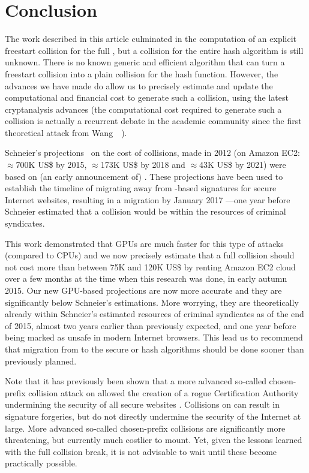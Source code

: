 \section{Conclusion}
\label{sec:conclusion}

The work described in this article culminated in the computation of an explicit freestart collision for the full \shaone, but a collision for the entire hash algorithm is still unknown.
There is no known generic and efficient algorithm that can turn a freestart collision into a plain collision for the hash function.
However, the advances we have made do allow us to precisely estimate and update the computational and financial cost to generate such a collision, using the latest cryptanalysis advances \cite{DBLP:conf/eurocrypt/Stevens13}
(the computational cost required to generate such a collision is actually a recurrent debate in the academic community since the first theoretical attack from Wang~\etal~\cite{DBLP:conf/crypto/WangYY05a}).

Schneier's projections~\cite{schneierSHA1} on the cost of \shaone collisions, made in 2012 (on Amazon EC2: $\approx$700K US\$ by 2015, $\approx$173K US\$ by 2018 and $\approx$43K US\$ by 2021) were based on
(an early announcement of) \cite{DBLP:conf/eurocrypt/Stevens13}. These projections have been used to establish the timeline of migrating away from \shaone-based signatures for secure Internet websites,
resulting in a migration by January 2017 ---one year before Schneier estimated that a \shaone collision would be within the resources of criminal syndicates. 

This work demonstrated that GPUs are much faster for this type of attacks (compared to CPUs)
and we now precisely estimate that a full \shaone collision should not cost more than between 75K and 120K US\$ by renting Amazon EC2 cloud over a few months at the time when this research was done, in early autumn 2015.
Our new GPU-based projections are now more accurate and they are significantly below Schneier's estimations. More worrying, they are theoretically already within Schneier's estimated resources of criminal syndicates as of the end of 2015,
almost two years earlier than previously expected, and one year before \shaone being marked as unsafe in modern Internet browsers.
This lead us to recommend that migration from \shaone to the secure \shatwo or \shathree hash algorithms should be done sooner than previously planned.

Note that it has previously been shown that a more advanced so-called chosen-prefix collision attack on \mdfive allowed the creation of a rogue Certification Authority undermining the security of all secure websites \cite{DBLP:conf/crypto/StevensSALMOW09}. 
Collisions on \shaone can result in \eg{} signature forgeries, but do not directly undermine the security of the Internet at large. More advanced so-called chosen-prefix collisions \cite{DBLP:conf/crypto/StevensSALMOW09}
are significantly more threatening, but currently much costlier to mount. Yet, given the lessons learned with the \mdfive full collision break, it is not advisable to wait until these become practically possible.

